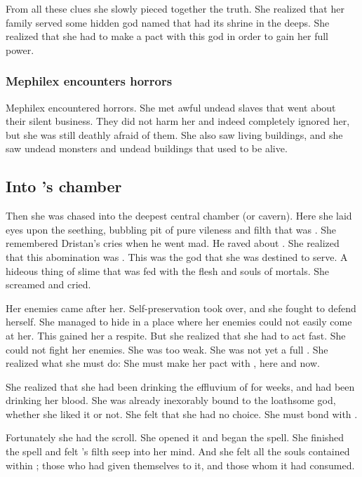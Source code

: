 From all these clues she slowly pieced together the truth.
She realized that her family served some hidden god named \Ubloth that had its shrine in the deeps. 
She realized that she had to make a pact with this god in order to gain her full power. 





\subsubsection{Mephilex encounters horrors}
Mephilex encountered horrors. 
She met awful undead slaves that went about their silent business.
They did not harm her and indeed completely ignored her, but she was still deathly afraid of them. 
She also saw living buildings, and she saw undead monsters and undead buildings that used to be alive. 









\subsection{Into \Ubloth's chamber}
Then she was chased into the deepest central chamber (or cavern).
Here she laid eyes upon the seething, bubbling pit of pure vileness and filth that was \Ubloth. 
She remembered Dristan's cries when he went mad.
He raved about . 
She realized that this abomination was \Ubloth. 
This was the god that she was destined to serve. 
A hideous thing of slime that was fed with the flesh and souls of mortals. 
She screamed and cried. 

Her enemies came after her.
Self-preservation took over, and she fought to defend herself.
She managed to hide in a place where her enemies could not easily come at her.
This gained her a respite.
But she realized that she had to act fast. 
She could not fight her enemies.
She was too weak.
She was not yet a full \rethyax.
She realized what she must do: 
She must make her pact with \Ubloth, here and now.

She realized that she had been drinking the effluvium of \Ubloth for weeks, and \Ubloth had been drinking her blood. 
She was already inexorably bound to the loathsome god, whether she liked it or not.
She felt that she had no choice. 
She must bond with \Ubloth.

Fortunately she had the scroll.
She opened it and began the spell. 
She finished the spell and felt \Ubloth's filth seep into her mind. 
And she felt all the souls contained within \Ubloth; those who had given themselves to it, and those whom it had consumed. 

